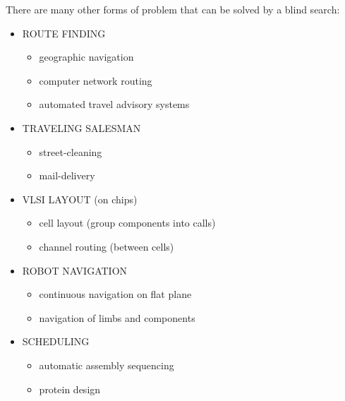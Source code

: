 \documentclass[../../lecture_notes.tex]{subfiles}
\begin{document}
\noindent There are many other forms of problem that can be solved by a blind search:
\begin{itemize}[itemsep=0mm]
	\item ROUTE FINDING
		\begin{itemize}[itemsep=0mm]
			\item geographic navigation
			\item computer network routing
			\item automated travel advisory systems
		\end{itemize}
	\item TRAVELING SALESMAN
		\begin{itemize}[itemsep=0mm]
			\item street-cleaning
			\item mail-delivery
		\end{itemize}
	\item VLSI LAYOUT (on chips)
		\begin{itemize}[itemsep=0mm]
			\item cell layout (group components into calls)
			\item channel routing (between cells)
		\end{itemize}
	\item ROBOT NAVIGATION
		\begin{itemize}[itemsep=0mm]
			\item continuous navigation on flat plane
			\item navigation of limbs and components
		\end{itemize}
	\item SCHEDULING
		\begin{itemize}[itemsep=0mm]
			\item automatic assembly sequencing
			\item protein design
		\end{itemize}
\end{itemize}
\end{document}
